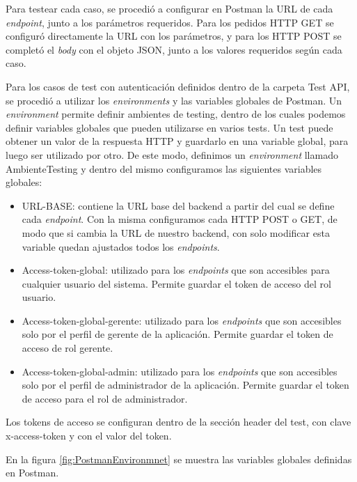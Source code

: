 Para testear cada caso, se procedió a configurar en Postman la URL de cada \textit{endpoint}, junto a los parámetros requeridos. Para los pedidos HTTP GET se configuró directamente la URL con los parámetros, y para los HTTP POST se completó el \textit{body} con el objeto JSON, junto a los valores requeridos según cada caso. 

\pagebreak
Para los casos de test con autenticación definidos dentro de la carpeta Test API, se procedió a utilizar los \textit{environments} y las variables globales de Postman. Un \textit{environment} permite definir ambientes de testing, dentro de los cuales podemos definir variables globales que pueden utilizarse en varios tests. Un test puede obtener un valor de la respuesta HTTP y guardarlo en una variable global, para luego ser utilizado por otro. De este modo, definimos un \textit{environment} llamado AmbienteTesting y dentro del mismo configuramos las siguientes variables globales:

\begin{itemize}
\item URL-BASE: contiene la URL base del backend a partir del cual se define cada \textit{endpoint}. Con la misma configuramos cada HTTP POST o GET, de modo que si cambia la URL de nuestro backend, con solo modificar esta variable quedan ajustados todos los \textit{endpoints}.

\item Access-token-global: utilizado para los \textit{endpoints} que son accesibles para cualquier usuario del sistema. Permite guardar el token de acceso del rol usuario.

\item Access-token-global-gerente: utilizado para los \textit{endpoints} que son accesibles solo por el perfil de gerente de la aplicación. Permite guardar el token de acceso de rol gerente.

\item Access-token-global-admin: utilizado para los \textit{endpoints} que son accesibles solo por el perfil de administrador de la aplicación. Permite guardar el token de acceso para el rol de administrador.
\end{itemize}

Los tokens de acceso se configuran dentro de la sección header del test, con clave x-access-token y con el valor del token.

En la figura \ref{fig:PostmanEnvironmnet} se muestra las variables globales definidas en Postman.

